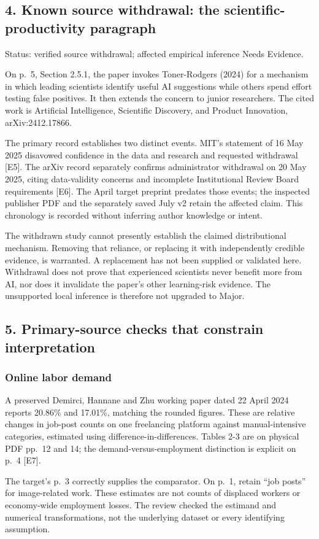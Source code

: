 \documentclass[10pt]{article}
\begin{document}
\subsection*{4. Known source withdrawal: the scientific-productivity paragraph}
Status: verified source withdrawal; affected empirical inference Needs Evidence.\par
On p. 5, Section 2.5.1, the paper invokes Toner-Rodgers (2024) for a mechanism in which leading scientists identify useful AI suggestions while others spend effort testing false positives. It then extends the concern to junior researchers. The cited work is Artificial Intelligence, Scientific Discovery, and Product Innovation, arXiv:2412.17866.\par
The primary record establishes two distinct events. MIT’s statement of 16 May 2025 disavowed confidence in the data and research and requested withdrawal [E5]. The arXiv record separately confirms administrator withdrawal on 20 May 2025, citing data-validity concerns and incomplete Institutional Review Board requirements [E6]. The April target preprint predates those events; the inspected publisher PDF and the separately saved July v2 retain the affected claim. This chronology is recorded without inferring author knowledge or intent.\par
The withdrawn study cannot presently establish the claimed distributional mechanism. Removing that reliance, or replacing it with independently credible evidence, is warranted. A replacement has not been supplied or validated here. Withdrawal does not prove that experienced scientists never benefit more from AI, nor does it invalidate the paper’s other learning-risk evidence. The unsupported local inference is therefore not upgraded to Major.\par
\subsection*{5. Primary-source checks that constrain interpretation}
\subsubsection*{Online labor demand}
A preserved Demirci, Hannane and Zhu working paper dated 22 April 2024 reports 20.86\% and 17.01\%, matching the rounded figures. These are relative changes in job-post counts on one freelancing platform against manual-intensive categories, estimated using difference-in-differences. Tables 2-3 are on physical PDF pp. 12 and 14; the demand-versus-employment distinction is explicit on p. 4 [E7].\par
The target’s p. 3 correctly supplies the comparator. On p. 1, retain “job posts” for image-related work. These estimates are not counts of displaced workers or economy-wide employment losses. The review checked the estimand and numerical transformations, not the underlying dataset or every identifying assumption.\par
\end{document}
